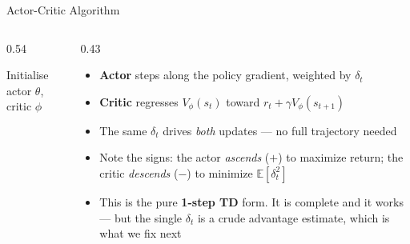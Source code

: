 \begin{frame}{Actor-Critic Algorithm}
\begin{columns}
\begin{column}{0.54\textwidth}
\begin{algorithm}[H]
\scriptsize
\caption{One-step Actor-Critic (online)}
Initialise actor $\theta$, critic $\phi$\;
\end{algorithm}
\end{column}
\begin{column}{0.43\textwidth}
\begin{itemize}
    \item \textbf{Actor} steps along the policy gradient, weighted by $\delta_t$
    \item \textbf{Critic} regresses $V_\phi(s_t)$ toward $r_t + \gamma V_\phi(s_{t+1})$
    \item The same $\delta_t$ drives \emph{both} updates --- no full trajectory needed
    \item Note the signs: the actor \emph{ascends} ($+$) to maximize return; the critic \emph{descends} ($-$) to minimize $\mathbb{E}[\delta_t^2]$
    \item This is the pure \textbf{1-step TD} form. It is complete and it works --- but the single $\delta_t$ is a crude advantage estimate, which is what we fix next
\end{itemize}
\end{column}
\end{columns}
\end{frame}
